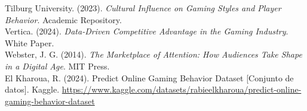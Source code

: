 \documentclass[oneside,11pt]{Latex/Classes/PhDthesisPSnPDF}
\begin{document}
Tilburg University. (2023). \emph{Cultural Influence on Gaming Styles
and Player Behavior}. Academic Repository.\\

Vertica. (2024). \emph{Data-Driven Competitive Advantage in the Gaming
Industry}. White Paper.\\

Webster, J. G. (2014). \emph{The Marketplace of Attention: How Audiences
Take Shape in a Digital Age}. MIT Press.\\

El Kharoua, R. (2024). Predict Online Gaming Behavior Dataset
{[}Conjunto de datos{]}. Kaggle.
\url{https://www.kaggle.com/datasets/rabieelkharoua/predict-online-gaming-behavior-dataset}\\

\renewcommand{\bibname}{Lista de Referencias}
 
 

\end{document}
